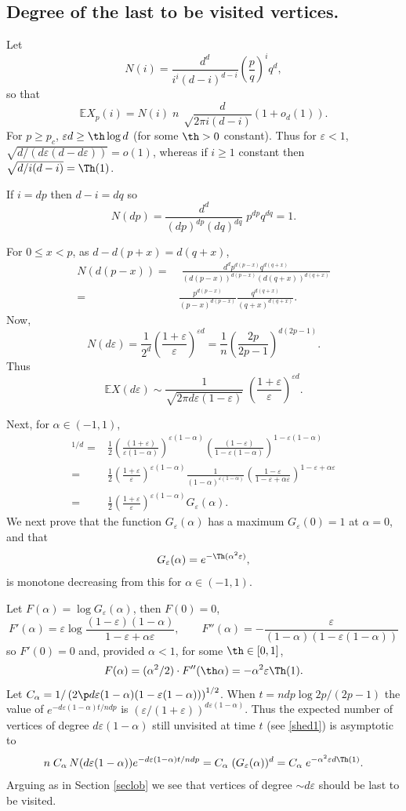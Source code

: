 \documentclass[12pt]{article}
\def\nn{\nonumber}
\def\a{\alpha} \def\b{\beta} \def\d{\delta} \def\D{\Delta}
\def\e{\varepsilon} \def\f{\phi} \def\F{{\Phi}} \def\vp{\varphi} \def\g{\gamma}
\newcommand{\brac}[1]{\left(#1\right)}
\newcommand{\bfrac}[2]{\left(\frac{#1}{#2}\right)}
\def\E{\mathbb{E}}
\def\nn{\nonumber}
\begin{document}
 \subsection{Degree of the last to be visited vertices.}\label{Last}
Let
\[
N(i)= \frac{d^d}{i^i(d-i)^{d-i}} \bfrac{p}{q}^i q^d,
\]
so that
\[
\E X_p(i) =N(i)\; n \; \sqrt \frac{d}{2\pi i(d-i)} (1+o_d(1)).
\]
For $p \ge p_c$,  $\e d \ge \th\log d$ (for some $\th>0$ constant). Thus
for $\e<1$, $\sqrt{d/(d\e(d-d\e))}=o(1)$, whereas if $i \ge 1$ constant then $\sqrt{d/i(d-i)}=\Th(1)$.


If $i=dp$ then $d-i=dq$ so
\[
N(dp)=\frac{d^d}{(dp)^{dp}(dq)^{dq}} \; p^{dp} q^{dq} =1.
\]

For $0 \le x <p$, as $d-d(p+x)=d(q+x)$,
\begin{align}\label{*1}
N(d(p-x))=&\; \frac{d^d p^{d(p-x)}q^{d(q+x)}}{(d(p-x))^{d(p-x)}(d(q+x))^{d(q+x)}} \nonumber\\
=&\frac{ p^{d(p-x)}}{(p-x)^{d(p-x)}}
\frac{q^{d(q+x)}}{(q+x)^{d(q+x)}}.
\end{align}
 Now,
\[
N(d\e)= \frac 1{2^d} \bfrac{1+\e}{\e}^{\e d}=\frac 1n \bfrac{2p}{2p-1}^{d(2p-1)}.
\]
Thus
\begin{equation}\label{Edex}
\E X(d\e) \sim \frac{1}{\sqrt{2\pi d\e(1-\e)}} \; \bfrac{1+\e}{\e}^{\e d}.
\end{equation}



Next, for $\a \in (-1,1)$,
\begin{align}
[N(d\e(1-\a))]^{1/d}=& \frac 12 \bfrac{ (1+\e)}{\e(1-\a)}^{\e(1-\a)} \bfrac{(1-\e)}{1-\e(1-\a)}^{1-\e(1-\a)} \nn\\
=& \frac 12 \bfrac{1+\e}{\e}^{\e(1-\a)} \frac 1{(1-\a)^{\e(1-\a)}} \bfrac{1-\e}{1-\e+\a\e}^{1-\e+\a\e}\nn\\
=& \frac 12 \bfrac{1+\e}{\e}^{\e(1-\a)} G_\e(\a). \label{Value 100}
\end{align}
We next prove  that the function $G_\e(\a)$ has a maximum $G_\e(0)=1$ at $\a=0$, and  that
\[
G_\e(\a)=  e^{-\Th(\a^2\e)},
\]
is monotone decreasing from this for $\a \in (-1,1)$.

Let $F(\a)=\log G_\e(\a)$, then $F(0)=0$,
\[
F'(\a)= \e \log \frac{(1-\e)(1-\a)}{1-\e+\a\e}, \qquad F''(\a)=-\frac{\e}{(1-\a)(1-\e(1-\a))}
\]
so $F'(0)=0$ and, provided $\a<1$, for some $\th \in [0,1]$,
\[
F(\a)=(\a^2/2)\cdot F''(\th \a)= -\a^2 \e \Th(1).
\]
Let
$C_\a=1/\brac{2\p d\e(1-\a)(1-\e(1-\a))}^{ 1/2} $.
When $t=ndp \log 2p/(2p-1)$ the value of $e^{-d\e(1-\a) t/ndp}$ is $(\e/(1+\e))^{d\e(1-\a)}$.
Thus the expected  number of  vertices of degree $d\e(1-\a)$ still unvisited at  time $t$ (see \eqref{shed1}) is asymptotic to
\[
n \;C_\a\,N(d\e(1-\a)) e^{-d\e(1-\a) t/ndp}=
 C_\a \;(G_\e(\a))^d= C_\a \; e^{-\a^2 \e d \Th(1)}.
\]
Arguing as in Section \ref{seclob} we see that  vertices of degree  $\sim d\e$ should be last to be visited.
\end{document}
